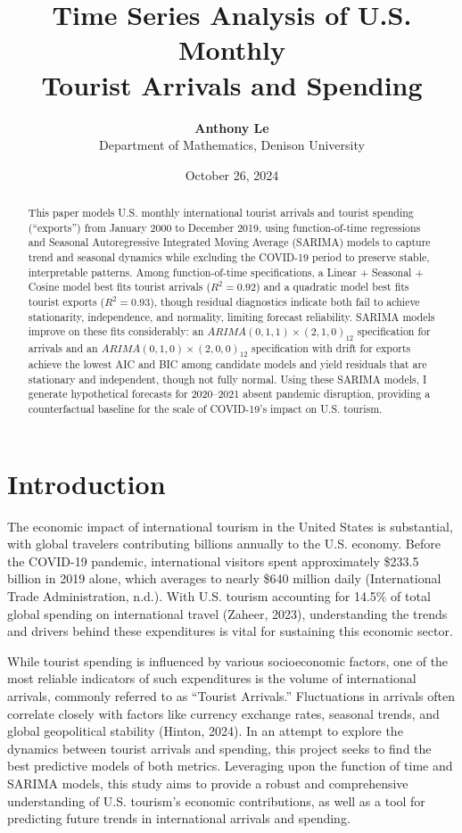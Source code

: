 \documentclass[11pt]{article}
\title{\textbf{Time Series Analysis of U.S. Monthly \\ Tourist Arrivals and Spending}}
\author{\textbf{Anthony Le} \\[0.3em] \normalsize Department of Mathematics, Denison University}
\date{October 26, 2024}
\begin{document}
\maketitle

\begin{abstract}
\noindent This paper models U.S. monthly international tourist arrivals and tourist spending (``exports'') from January 2000 to December 2019, using function-of-time regressions and Seasonal Autoregressive Integrated Moving Average (SARIMA) models to capture trend and seasonal dynamics while excluding the COVID-19 period to preserve stable, interpretable patterns. Among function-of-time specifications, a Linear + Seasonal + Cosine model best fits tourist arrivals ($R^2 = 0.92$) and a quadratic model best fits tourist exports ($R^2 = 0.93$), though residual diagnostics indicate both fail to achieve stationarity, independence, and normality, limiting forecast reliability. SARIMA models improve on these fits considerably: an $ARIMA(0,1,1)\times(2,1,0)_{12}$ specification for arrivals and an $ARIMA(0,1,0)\times(2,0,0)_{12}$ specification with drift for exports achieve the lowest AIC and BIC among candidate models and yield residuals that are stationary and independent, though not fully normal. Using these SARIMA models, I generate hypothetical forecasts for 2020--2021 absent pandemic disruption, providing a counterfactual baseline for the scale of COVID-19's impact on U.S. tourism.
\end{abstract}

\section{Introduction}

The economic impact of international tourism in the United States is substantial, with global travelers contributing billions annually to the U.S. economy. Before the COVID-19 pandemic, international visitors spent approximately \$233.5 billion in 2019 alone, which averages to nearly \$640 million daily (International Trade Administration, n.d.). With U.S. tourism accounting for 14.5\% of total global spending on international travel (Zaheer, 2023), understanding the trends and drivers behind these expenditures is vital for sustaining this economic sector.

While tourist spending is influenced by various socioeconomic factors, one of the most reliable indicators of such expenditures is the volume of international arrivals, commonly referred to as ``Tourist Arrivals.'' Fluctuations in arrivals often correlate closely with factors like currency exchange rates, seasonal trends, and global geopolitical stability (Hinton, 2024). In an attempt to explore the dynamics between tourist arrivals and spending, this project seeks to find the best predictive models of both metrics. Leveraging upon the function of time and SARIMA models, this study aims to provide a robust and comprehensive understanding of U.S. tourism's economic contributions, as well as a tool for predicting future trends in international arrivals and spending.
\end{document}
